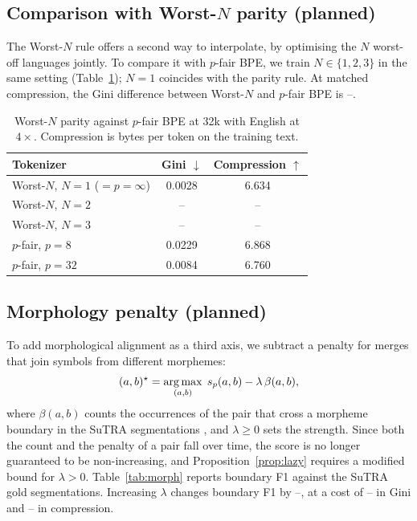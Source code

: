 \subsection{Comparison with Worst-$N$ parity (planned)}
\label{sec:worstn}

The Worst-$N$ rule \citep{kanjirangat2026} offers a second way to interpolate, by
optimising the $N$ worst-off languages jointly. To compare it with $p$-fair BPE, we train
$N\in\{1,2,3\}$ in the same setting (Table~\ref{tab:worstn}); $N=1$ coincides with the
parity rule. At matched compression, the Gini difference between Worst-$N$ and $p$-fair BPE
is --.

\begin{table}[t]
\centering
\small
\begin{tabular}{lcc}
\toprule
Tokenizer & Gini $\downarrow$ & Compression $\uparrow$\\
\midrule
Worst-$N$, $N=1$ ($=p{=}\infty$) & 0.0028 & 6.634\\
Worst-$N$, $N=2$ & -- & --\\
Worst-$N$, $N=3$ & -- & --\\
$p$-fair, $p=8$ & 0.0229 & 6.868\\
$p$-fair, $p=32$ & 0.0084 & 6.760\\
\bottomrule
\end{tabular}
\caption{Worst-$N$ parity against $p$-fair BPE at 32k with English at $4\times$.
Compression is bytes per token on the training text.}
\label{tab:worstn}
\end{table}

\subsection{Morphology penalty (planned)}
\label{sec:morph}

To add morphological alignment as a third axis, we subtract a penalty for merges that join
symbols from different morphemes:
\begin{equation}
  (a,b)^\star = \operatorname*{arg\,max}_{(a,b)}\; s_p(a,b) - \lambda\,\beta(a,b),
  \label{eq:morph}
\end{equation}
where $\beta(a,b)$ counts the occurrences of the pair that cross a morpheme boundary in the
SuTRA segmentations \citep{rathore2026}, and $\lambda\ge0$ sets the strength. Since both the
count and the penalty of a pair fall over time, the score is no longer guaranteed to be
non-increasing, and Proposition~\ref{prop:lazy} requires a modified bound for $\lambda>0$.
Table~\ref{tab:morph} reports boundary F1 against the SuTRA gold segmentations. Increasing
$\lambda$ changes boundary F1 by --, at a cost of -- in Gini and -- in compression.

